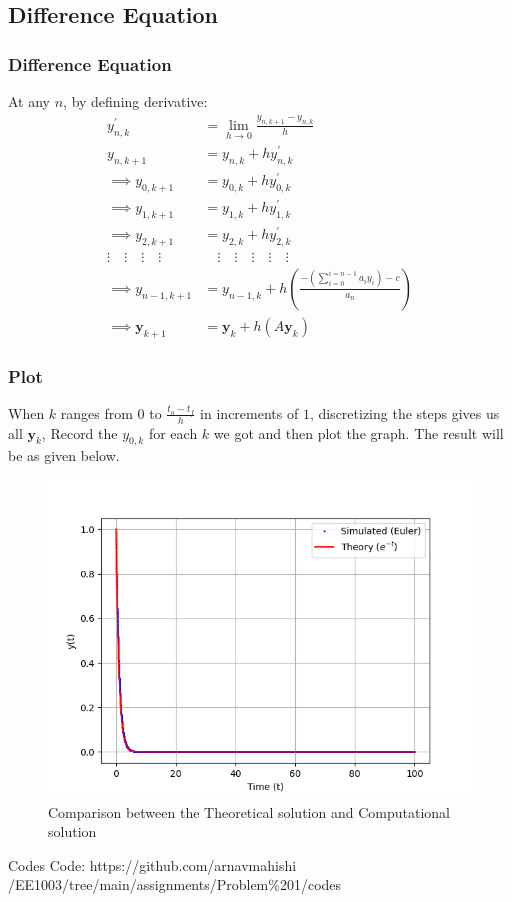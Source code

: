\documentclass{beamer}
\providecommand{\brak}[1]{\ensuremath{\left(#1\right)}}
\theoremstyle{remark}
\let\vec\mathbf
\numberwithin{equation}{section}
\begin{document}
\subsection{Difference Equation}
\begin{frame}[fragile]
\frametitle{Difference Equation}
At any $n$, by defining derivative:
\begin{align}
	y_{n,k}^{\prime} &= \lim_{h\to 0}\frac{y_{n,k+1} - y_{n,k}}{h}\\
	y_{n,k+1} &= y_{n,k} + hy_{n,k}^{\prime}\\
    \implies y_{0,k+1} &= y_{0,k} + hy_{0,k}^{\prime}\\
    \implies y_{1,k+1} &= y_{1,k} + hy_{1,k}^{\prime}\\
    \implies y_{2,k+1} &= y_{2,k} + hy_{2,k}^{\prime}\\
\vdots\quad\vdots\quad\vdots\quad\vdots&\quad\vdots\quad\vdots\quad\vdots\quad\vdots\quad\vdots\\
    \implies y_{n-1,k+1} &= y_{n-1,k} + h\brak{\frac{-\brak{\sum_{i=0}^{i=n-1}a_iy_i}-c}{a_n}}\\
    \implies  \vec{y}_{k+1}&=\vec{y}_k+h\brak{A\vec{y}_k}
\end{align}
\end{frame}
\begin{frame}[fragile]
\frametitle{Plot}
When $k$ ranges from $0$ to $\frac{t_o-t_f}{h}$ in increments of $1$, discretizing the steps gives us all $\vec{y}_k$, Record the $y_{0,k}$ for each $k$ we got and then plot the graph. The result will be as given below.\\
\end{frame}
\begin{frame}[fragile]
\begin{figure}[H]
   \centering
   \includegraphics[width=1\linewidth]{figs/fig.png}
   \caption{Comparison between the Theoretical solution and Computational solution}
   \label{stemplot}
\end{figure}
\end{frame}
\begin{frame}{Codes}
   Code: https://github.com/arnavmahishi\\/EE1003/tree/main/assignments/Problem\%201/codes 
\end{frame}
\end{document}
